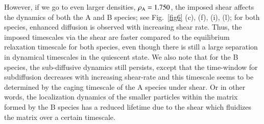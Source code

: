 However, if we go to even larger densities, $\rho_{\rm A}=1.750$, the imposed shear affects the dynamics of both the A and B species; see Fig.~\ref{fig6} (c), (f), (i), (l); for both species, enhanced diffusion is observed with increasing shear rate. Thus, the imposed timescales via the shear are faster compared to the equilibrium relaxation timescale for both species, even though there is still a large separation in dynamical timescales in the quiescent state. We also note that for the B species, the sub-diffusive dynamics still persists, except that the time-window for subdiffusion decreases with increasing shear-rate and this timescale seems to be determined by the caging timescale of the A species under shear. Or in other words, the localization dynamics of the smaller particles within the matrix formed by the B species has a reduced lifetime due to the shear which fluidizes the matrix over a certain timescale.

